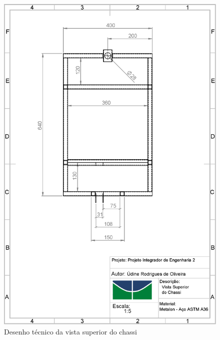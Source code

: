 \begin{apendicesenv}
\begin{figure}[!htbp]
	\centering
	\includegraphics[width=\textwidth]{figuras/chassi_superior.eps}
	\caption{Desenho técnico da vista superior do chassi}
\end{figure}

\end{apendicesenv}
